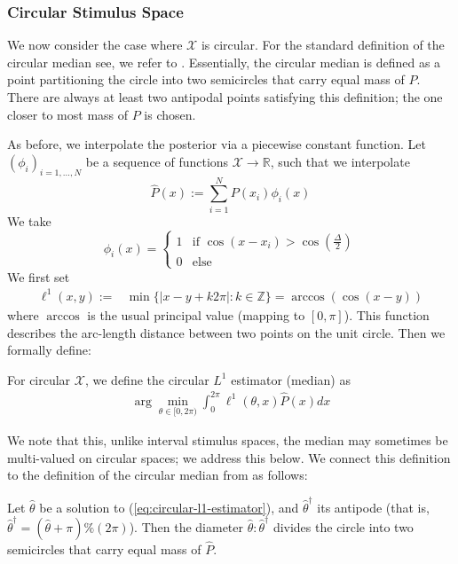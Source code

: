 \subsubsection*{Circular Stimulus Space}



We now consider the case where $\mathcal{X}$ is circular.
For the standard definition of the circular median see, we refer to \citet{otieno2003more}. 
Essentially, the circular median is defined as a point partitioning the circle into two semicircles that carry equal mass of $P$. There are always at least two antipodal points satisfying this definition; the one closer to most mass of $P$ is chosen.


As before, we interpolate the posterior via a piecewise constant function.
Let $(\phi_i)_{i=1, \dots, N}$ be a sequence of functions $\mathcal{X} \rightarrow \mathbb{R}$, such that we interpolate
\begin{equation}
    \widehat{P}(x) := \sum_{i=1}^N P(x_i) \phi_i(x)
\end{equation}
We take
\begin{equation}
    \phi_i(x) = \begin{cases}
        1 & \text{if } \cos(x-x_i) > \cos(\frac{\Delta}{2}) \\
        0 & \text{else}
    \end{cases}
\end{equation}
We first set
\begin{align*}
    \ell^1(x,y) := & \min \{|x-y+k2\pi| : k \in \mathbb{Z}\} = \arccos(\cos(x-y))
\end{align*}
where $\arccos$ is the usual principal value (mapping to $[0,\pi]$). 
This function describes the arc-length distance between two points on the unit circle.
Then we formally define:
\begin{defin}
For circular $\mathcal{X}$, we define the circular $L^1$ estimator (median) as
\begin{align}\label{eq:circular-l1-estimator}
     \arg\min_{\theta \in [0,2\pi)} \int_0^{2\pi} \ell^1(\theta,x) \widehat{P}(x) dx 
\end{align}
\end{defin}
We note that this, unlike interval stimulus spaces, the median may sometimes be multi-valued on circular spaces; we address this below.
We connect this definition to the definition of the circular median from \citet{otieno2003more} as follows: 
\begin{lemma}
Let $\widehat{\theta}$ be a solution to (\ref{eq:circular-l1-estimator}), and $\widehat{\theta}^\dagger$ its antipode (that is, $\widehat{\theta}^\dagger = (\widehat{\theta} + \pi) \% (2\pi)$).
Then the diameter $\widehat{\theta} : \widehat{\theta}^\dagger$  divides the circle into two semicircles that carry equal mass of $\widehat{P}$.
\end{lemma}
